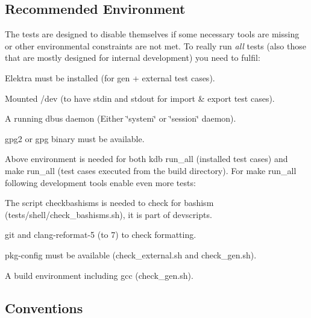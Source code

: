 \subsection*{Recommended Environment}

The tests are designed to disable themselves if some necessary tools are missing or other environmental constraints are not met. To really run {\itshape all} tests (also those that are mostly designed for internal development) you need to fulfil\+:


\begin{DoxyItemize}
\item Elektra must be installed (for gen + external test cases).
\item Mounted /dev (to have stdin and stdout for import \& export test cases).
\item A running dbus daemon (Either \char`\"{}system\char`\"{} or \char`\"{}session\char`\"{} daemon).
\item {\ttfamily gpg2} or {\ttfamily gpg} binary must be available.
\end{DoxyItemize}

Above environment is needed for both {\ttfamily kdb run\+\_\+all} (installed test cases) and {\ttfamily make run\+\_\+all} (test cases executed from the build directory). For {\ttfamily make run\+\_\+all} following development tools enable even more tests\+:


\begin{DoxyItemize}
\item The script {\ttfamily checkbashisms} is needed to check for bashism (tests/shell/check\+\_\+bashisms.\+sh), it is part of {\ttfamily devscripts}.
\item {\ttfamily git} and {\ttfamily clang-\/reformat-\/5} (to 7) to check formatting.
\item {\ttfamily pkg-\/config} must be available (check\+\_\+external.\+sh and check\+\_\+gen.\+sh).
\item A build environment including gcc (check\+\_\+gen.\+sh).
\end{DoxyItemize}

\subsection*{Conventions}


